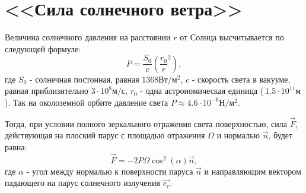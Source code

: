 \documentclass[tikz, a4paper,12pt]{extreport}
\begin{document}
  \section{<<Сила солнечного ветра>>}
  \noindent\indent
  Величина солнечного давления на расстоянии $r$ от Солнца высчитывается по следующей формуле:
  \begin{equation}
    P = \frac{S_0}{c}\left(\frac{r_0}{r}^2\right),
  \end{equation}
  где $S_0$ - солнечная постонная, равная $1368 \text{Вт}/\text{м}^2$, $c$ - скорость
  света в вакууме, равная приблизительно $3 \cdot 10^8 \text{м}/\text{с}$, $r_0$ -
  одна астрономическая единица ($~1.5 \cdot 10^{11} \text{м}$). Так на околоземной орбите
  давление света $P \approx 4.6 \cdot 10^{-6} \text{Н}/\text{м}^2$.\par
  Тогда, при условии полного зеркального отражения света поверхностью, сила $\vec{F}$,
  действующая на плоский парус с площадью отражения $\Omega$ и нормалью $\vec{n}$, будет равна:
  \begin{equation}
    \vec{F} = -2P\Omega\cos^2{(\alpha)}\vec{n},
  \end{equation}
  где $\alpha$ - угол между нормалью к поверхности паруса $\vec{n}$ и направляющим
  вектором падающего на парус солнечного излучения $\vec{e_r}$.
\end{document}
